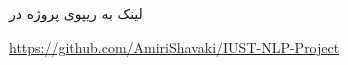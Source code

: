 \Section
{لینک به ریپوی پروژه در }
{
\begin{center}
\url{https://github.com/AmiriShavaki/IUST-NLP-Project}
\end{center}
}